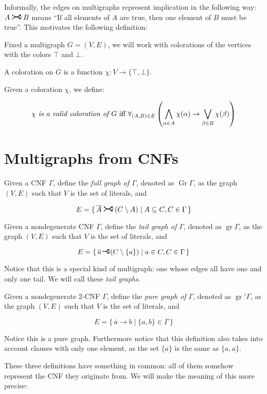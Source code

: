 \documentclass[11pt]{article}
\newcommand{\conj}[1]{\overline{#1}}
\DeclareMathOperator{\gr}{gr}
\DeclareMathOperator{\Gr}{Gr}
\newcommand{\rightcurvearrow}{
\mathrel{
  \begin{tikzpicture}[scale=0.8]
    \draw[thick,->] (0,1ex) arc (30:150:-2ex);
    \draw[thick,->] (0,-1ex) arc (150:30:2ex);
  \end{tikzpicture}
}
}
\newcommand{\rightcurveor}{
\!
\mathrel{
  \begin{tikzpicture}[scale=0.8]
    \draw[thick,->] (0,0) arc (90:150:-2ex);
    \draw[thick,->] (0,0) arc (90:30:2ex);
    \draw[thick] (-1ex, 0) -- (0.1ex,0);
  \end{tikzpicture}
}\!
}
\begin{document}
Informally, the edges on multigraphs represent implication in the following way: $A \rightcurvearrow B$ means ``If all elements of $A$ are true, then one element of $B$ must be true''. This motivates the following definition:

Fixed a multigraph $G = (V,E)$, we will work with colorations of the vertices with the colors $\top$ and $\bot$.

A coloration on $G$ is a function $\chi : V \rightarrow \{\top, \bot\}$.

Given a coloration $\chi$, we define:

\[ \chi \text{\emph{ is a valid coloration of $G$} iff } \forall_{(A,B) \in E} \left( \bigwedge_{\alpha \in A} \chi(\alpha) \rightarrow \bigvee_{\beta \in B} \chi(\beta) \right)\]

\section{Multigraphs from CNFs}

Given a CNF $\Gamma$, define the \emph{full graph of $\Gamma$}, denoted as $\Gr \Gamma$, as the graph $(V,E)$ such that $V$ is the set of literals, and

\[ E = \{ \, \conj A \rightcurvearrow (C \setminus A) \mid A \subseteq C, C \in \Gamma \, \}\]

Given a nondegenerate CNF $\Gamma$, define the \emph{tail graph of $\Gamma$}, denoted as $\gr \Gamma$, as the graph $(V,E)$ such that $V$ is the set of literals, and

\[ E = \{ \, \conj a \rightcurveor (C \setminus \{a\}) \mid a \in C, C \in \Gamma \, \}\]

Notice that this is a special kind of multigraph: one whose edges all have one and only one tail. We will call these \emph{tail graphs}.

Given a nondegenerate 2-CNF $\Gamma$, define the \emph{pure graph of $\Gamma$}, denoted as $\gr'\Gamma$, as the graph $(V,E)$ such that $V$ is the set of literals, and

\[ E = \{ \, \conj a \rightarrow b \mid \{a,b\} \in \Gamma \, \} \]

Notice this is a pure graph. Furthermore notice that this definition also takes into account clauses with only one element, as the set $\{a\}$ is the same as $\{a,a\}$.

These three definitions have something in common: all of them somehow represent the CNF they originate from. We will make the meaning of this more precise:
\end{document}

